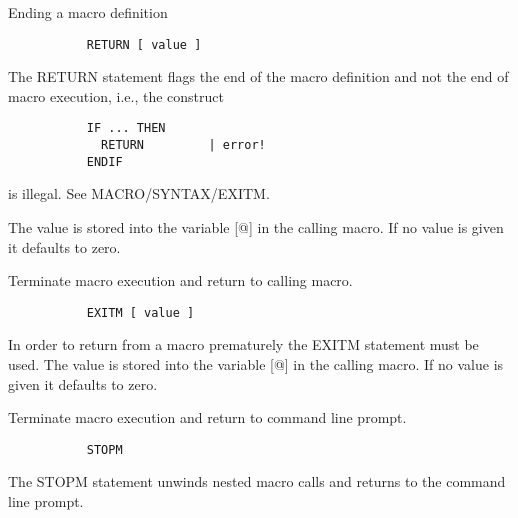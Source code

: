 \ENDCMD


   \par
Ending a macro definition 

\begin{verbatim}
           RETURN [ value ]
\end{verbatim}
   \par
The RETURN statement flags the end of the macro definition and not the end 
   of macro execution, i.e., the construct 

\begin{verbatim}
           IF ... THEN
             RETURN         | error!
           ENDIF
\end{verbatim}
\ENDVERB
   \par
is illegal.  See MACRO/SYNTAX/EXITM.  

   \par
The value is stored into the variable [@] in the calling macro. If no value 
   is given it defaults to zero.  

\ENDCMD


   \par
Terminate macro execution and return to calling macro.  

\begin{verbatim}
           EXITM [ value ]
\end{verbatim}
\ENDVERB
   \par
In order to return from a macro prematurely the EXITM statement must be 
   used.  The value is stored into the variable [@] in the calling macro. If 
   no value is given it defaults to zero.  

\ENDCMD


   \par
Terminate macro execution and return to command line prompt.  

\begin{verbatim}
           STOPM
\end{verbatim}
\ENDVERB
   \par
The STOPM statement unwinds nested macro calls and returns to the command 
   line prompt.  

\ENDCMD


